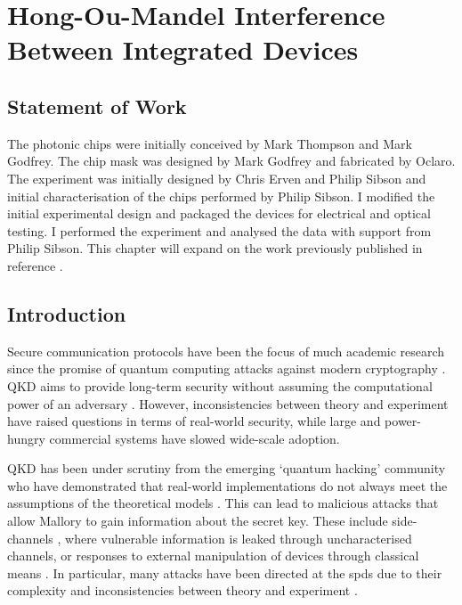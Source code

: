 %
\graphicspath{{./chapters/chapter03/fig03/}}

\let\textcircled=\pgftextcircled
\chapter[HOM Interference Between Integrated Devices]{Hong-Ou-Mandel Interference Between Integrated Devices}
\label{chap:hom}

\section*{Statement of Work}

The photonic chips were initially conceived by Mark Thompson and Mark Godfrey. The chip mask was designed by Mark Godfrey and fabricated by Oclaro. The experiment was initially designed by Chris Erven and Philip Sibson and initial characterisation of the chips performed by Philip Sibson. I modified the initial experimental design and packaged the devices for electrical and optical testing. I performed the experiment and analysed the data with support from Philip Sibson. This chapter will expand on the work previously published in reference \cite{semenenko2019}.

\section{Introduction}

Secure communication protocols have been the focus of much academic research since the promise of quantum computing attacks against modern cryptography \cite{shor1994}. \Ac{QKD} aims to provide long-term security without assuming the computational power of an adversary \cite{BB84, E91}. However, inconsistencies between theory and experiment have raised questions in terms of real-world security, while large and power-hungry commercial systems have slowed wide-scale adoption.

\Ac{QKD} has been under scrutiny from the emerging `quantum hacking' community who have demonstrated that real-world implementations do not always meet the assumptions of the theoretical models \cite{mdi-qkd}. This can lead to malicious attacks that allow Mallory to gain information about the secret key. These include side-channels \cite{Lamas-Linares2007}, where vulnerable information is leaked through uncharacterised channels, or responses to external manipulation of devices through classical means \cite{Gisin2006}. In particular, many attacks have been directed at the \acp{spd} due to their complexity and inconsistencies between theory and experiment \cite{Lydersen2010b,Zhao2008, Makarov2006}.

